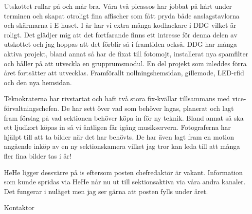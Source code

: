 \documentclass[../_main/handlingar.tex]{subfiles}
\begin{document}
Utskottet rullar på och mår bra. Våra två picassos har jobbat på hårt under terminen och skapat otroligt fina affischer som fått pryda både anslagstavlorna och skärmarna i E-huset. I år har vi extra många kodhackare i DDG vilket är roligt. Det glädjer mig att det fortfarande finns ett intresse för denna delen av utskottet och jag hoppas att det förblir så i framtiden också. DDG har många aktiva projekt, bland annat så har de fixat till fotomojt, installerat nya spamfilter och håller på att utveckla en grupprumsmodul. En del projekt som inleddes förra året fortsätter att utvecklas. Framförallt nollningshemsidan, gillemode, LED-rfid och den nya hemsidan.

Teknokraterna har rivstartat och haft två stora fix-kvällar tillsammans med vice-förvaltningschefen. De har sett över vad som behöver lagas, planerat och lagt fram förslag på vad sektionen behöver köpa in för ny teknik. Bland annat så ska ett ljudkort köpas in så vi äntligen får igång musikservern. Fotograferna har hjälpt till att ta bilder när det har behövts. De har även lagt fram en motion angående inköp av en ny sektionskamera vilket jag tror kan leda till att många fler fina bilder tas i år!

HeHe ligger dessvärre på is eftersom posten chefredaktör är vakant. Information som kunde spridas via HeHe når nu ut till sektionsaktiva via våra andra kanaler. Det fungerar i nuläget men jag ser gärna att posten fylls under året.  

\begin{signatures}{1}
    \mvh
    \signature{Axel Voss}{Kontaktor}
\end{signatures}
\end{document}
